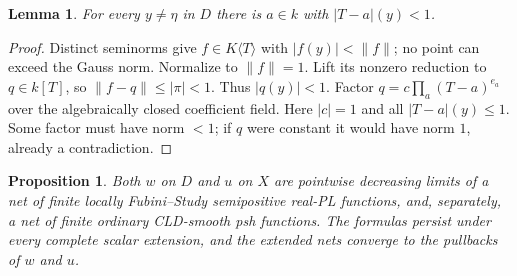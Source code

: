 \documentclass[11pt]{article}
\newtheorem{lemma}[theorem]{Lemma}
\newtheorem{proposition}[theorem]{Proposition}
\begin{document}
\begin{lemma}\label{lem:detection}
For every $y\ne\eta$ in $D$ there is $a\in k$ with $|T-a|(y)<1$.
\end{lemma}
\begin{proof}
Distinct seminorms give $f\in K\langle T\rangle$ with
$|f(y)|<\|f\|$; no point can exceed the Gauss norm. Normalize to
$\|f\|=1$. Lift its nonzero reduction to $q\in k[T]$, so
$\|f-q\|\le|\pi|<1$. Thus $|q(y)|<1$. Factor
$q=c\prod_a(T-a)^{e_a}$ over the algebraically closed coefficient field.
Here $|c|=1$ and all $|T-a|(y)\le1$. Some factor must have norm $<1$;
if $q$ were constant it would have norm $1$, already a contradiction.
\end{proof}

\begin{proposition}\label{prop:nets}
Both $w$ on $D$ and $u$ on $X$ are pointwise decreasing limits of a
net of finite locally Fubini--Study semipositive real-PL functions,
and, separately, a net of finite ordinary CLD-smooth psh functions.
The formulas persist under every complete scalar extension, and the
extended nets converge to the pullbacks of $w$ and $u$.
\end{proposition}
\end{document}
